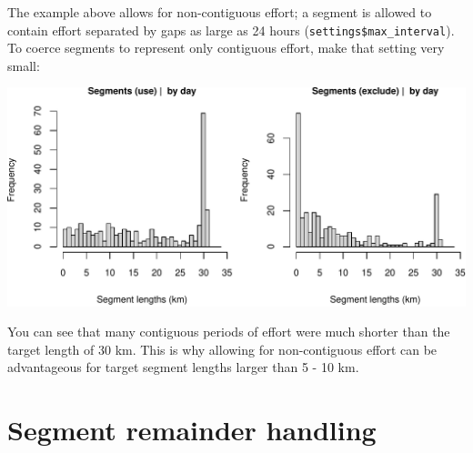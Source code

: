 \documentclass[
]{book}
\newenvironment{Shaded}{\begin{snugshade}}{\end{snugshade}}
\newcommand{\CommentTok}[1]{\textcolor[rgb]{0.56,0.35,0.01}{\textit{#1}}}
\newcommand{\DataTypeTok}[1]{\textcolor[rgb]{0.13,0.29,0.53}{#1}}
\newcommand{\DecValTok}[1]{\textcolor[rgb]{0.00,0.00,0.81}{#1}}
\newcommand{\FloatTok}[1]{\textcolor[rgb]{0.00,0.00,0.81}{#1}}
\newcommand{\KeywordTok}[1]{\textcolor[rgb]{0.13,0.29,0.53}{\textbf{#1}}}
\newcommand{\NormalTok}[1]{#1}
\newcommand{\OperatorTok}[1]{\textcolor[rgb]{0.81,0.36,0.00}{\textbf{#1}}}
\newcommand{\OtherTok}[1]{\textcolor[rgb]{0.56,0.35,0.01}{#1}}
\newcommand{\StringTok}[1]{\textcolor[rgb]{0.31,0.60,0.02}{#1}}
\begin{document}
The example above allows for non-contiguous effort; a segment is allowed to contain effort separated by gaps as large as 24 hours (\texttt{settings\$max\_interval}). To coerce segments to represent only contiguous effort, make that setting very small:

\begin{Shaded}
\end{Shaded}

\includegraphics{figures/unnamed-chunk-272-1.pdf}

You can see that many contiguous periods of effort were much shorter than the target length of 30 km. This is why allowing for non-contiguous effort can be advantageous for target segment lengths larger than 5 - 10 km.

\hypertarget{segment-remainder-handling}{%
\section*{Segment remainder handling}\label{segment-remainder-handling}}
\end{document}
